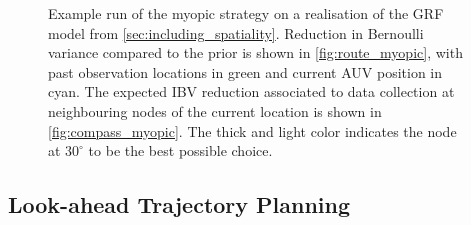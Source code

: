 \documentclass[aoas]{imsart}
\begin{document}
\begin{figure}[ht] 
\centering 
{}
\hspace{2em}
\hspace{2em}
\caption{Example run of the myopic strategy on a realisation of the GRF
model from \ref{sec:including_spatiality}. Reduction in Bernoulli variance
compared to the prior is shown in \ref{fig:route_myopic}, with past observation
locations in green and current AUV position in cyan. The expected IBV reduction
associated to data collection at neighbouring nodes of the current location is
shown in \ref{fig:compass_myopic}. The thick and light color indicates the node at $30 ^{\circ}$ to be the best possible choice.}
\label{fig:ebv_myopic}
\end{figure}





\subsection{Look-ahead Trajectory Planning}
\label{sec:LA}
\end{document}
